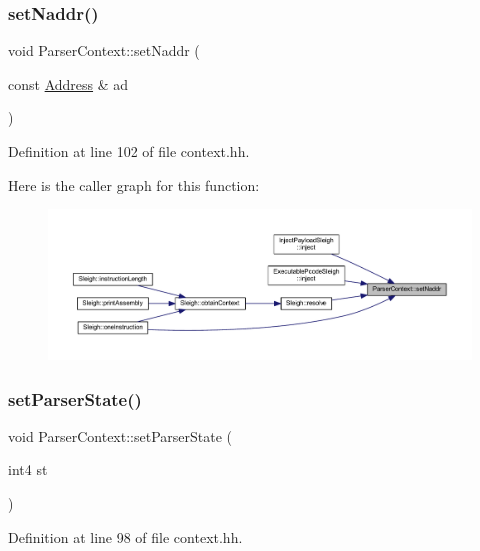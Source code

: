\subsubsection{\texorpdfstring{setNaddr()}{setNaddr()}}
{\footnotesize\ttfamily void Parser\+Context\+::set\+Naddr (\begin{DoxyParamCaption}\item[{const \mbox{\hyperlink{class_address}{Address}} \&}]{ad }\end{DoxyParamCaption})\hspace{0.3cm}{\ttfamily [inline]}}



Definition at line 102 of file context.\+hh.

Here is the caller graph for this function\+:
\nopagebreak
\begin{figure}[H]
\begin{center}
\leavevmode
\includegraphics[width=350pt]{class_parser_context_ae9a4db4a509177c0797092372dfaabcb_icgraph}
\end{center}
\end{figure}
\mbox{\label{class_parser_context_a49b8c4b331d6dad48a146c0675bf08c6}} 
\subsubsection{\texorpdfstring{setParserState()}{setParserState()}}
{\footnotesize\ttfamily void Parser\+Context\+::set\+Parser\+State (\begin{DoxyParamCaption}\item[{int4}]{st }\end{DoxyParamCaption})\hspace{0.3cm}{\ttfamily [inline]}}



Definition at line 98 of file context.\+hh.

